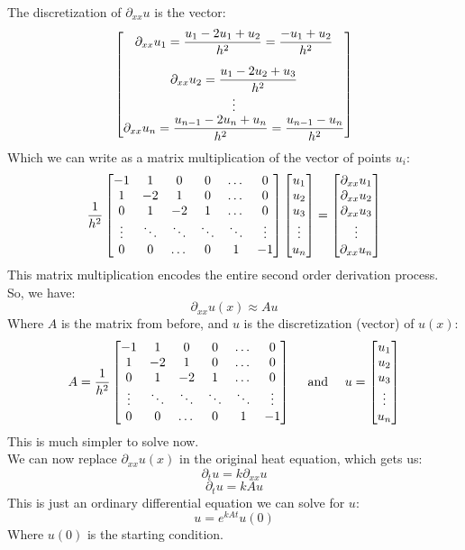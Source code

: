 \documentclass[12pt]{article}
\begin{document}
The discretization of $\partial_{xx} u$
is the vector:
\[ \bmat{
    \partial_{xx} u_1 = \dfrac{u_1 - 2u_1 + u_2}{h^2} 
    = \dfrac{-u_1 + u_2}{h^2} \vs{10} \\
    \partial_{xx} u_2 = \dfrac{u_1 - 2u_2 + u_3}{h^2} \\
    \vdots \\
    \partial_{xx} u_n = \dfrac{u_{n-1} - 2u_n + u_n}{h^2}
    = \dfrac{u_{n-1} -u_n}{h^2}}
\]
Which we can write as a matrix multiplication
of the vector of points $u_i$:
\[ \dfrac{1}{h^2}
\begin{bmatrix} -1 & 1 & 0 & 0 & \dots & 0 \\
1 & -2 & 1 & 0 & \dots & 0 \\
0 & 1 & -2 & 1 & \dots & 0 \\
\vdots & \ddots & \ddots & \ddots & \ddots & \vdots \\
0 & 0 & \dots & 0 & 1 & -1  \end{bmatrix}
\begin{bmatrix} u_1 \\ u_2 \\ u_3 \\ \vdots \\ u_n \end{bmatrix}
= \begin{bmatrix} \partial_{xx} u_1 \\ \partial_{xx} u_2 \\
\partial_{xx} u_3 \\ \vdots \\ \partial_{xx} u_n \end{bmatrix} \]
This matrix multiplication encodes the entire
second order derivation process. \\

So, we have:
\[ \partial_{xx} u(x) \approx Au \]
Where $A$ is the matrix from before,
and $u$ is the discretization (vector) of $u(x)$:
\[ A = \dfrac{1}{h^2}
\begin{bmatrix} -1 & 1 & 0 & 0 & \dots & 0 \\
1 & -2 & 1 & 0 & \dots & 0 \\
0 & 1 & -2 & 1 & \dots & 0 \\
\vdots & \ddots & \ddots & \ddots & \ddots & \vdots \\
0 & 0 & \dots & 0 & 1 & -1  \end{bmatrix}
\quad \text{ and } \quad u = 
\begin{bmatrix} u_1 \\ u_2 \\ u_3 \\ \vdots \\ u_n \end{bmatrix} \]
This is much simpler to solve now. \\

We can now replace $\partial_{xx} u(x)$
in the original heat equation, which gets us:
\[\partial_t u = k \partial_{xx} u \]
\[ \partial_t u = kAu \]
This is just an ordinary differential equation
we can solve for $u$:
\[ u = e^{kAt}u(0) \]
Where $u(0)$ is the starting condition. \\
\end{document}
